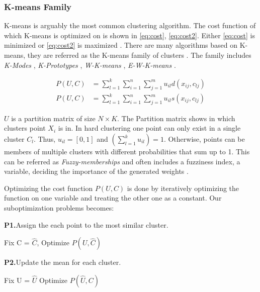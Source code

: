 \documentclass[../report.tex]{subfiles}
\begin{document}
\subsubsection{K-means Family}
K-means is arguably the most common clustering algorithm. The cost function of which K-means is optimized on is shown in \ref{eq:cost}, \ref{eq:cost2}. Either \ref{eq:cost} is minimized or \ref{eq:cost2} is maximized \cite{huang2005automated}.
There are many algorithms based on K-means, they are referred as the K-means family of clusters \cite{Huang1998}. The family includes \textit{K-Modes} \cite{Ng1999}, \textit{K-Prototypes} \cite{Huang97clusteringlarge}, \textit{W-K-means} \cite{huang2005automated}, \textit{E-W-K-means} \cite{Jing2007}.

\begin{align}
  \label{eq:cost}
  P(U,C) &= \sum^k_{l=1} \sum^n_{i=1} \sum^m_{j=1} u_{il} d(x_{ij},c_{lj}) \\
  \label{eq:cost2}
  P(U,C) &= \sum^k_{l=1} \sum^n_{i=1} \sum^m_{j=1} u_{il} s(x_{ij},c_{lj})
\end{align}

$U$ is a partition matrix of size $N \times K$. The Partition matrix shows in which clusters point $X_i$ is in.  In hard clustering one point can only exist in a single cluster $C_l$. Thus, $u_{il} = [0,1]$ and $(\sum_{ l=1 }^{ k } u_{il}) = 1$. Otherwise, points can be members of multiple clusters with different probabilities that sum up to 1. This can be referred as \textit{Fuzzy-memberships} and often includes a fuzziness index, a variable, deciding the importance of the generated weights \cite{Gan2006}.

Optimizing the cost function $P(U,C)$ is done by iteratively optimizing the function on one variable and treating the other one as a constant. Our suboptimization problems becomes:

\begin{description}
  \item \textbf{P1.}\quad Assign the each point to the most similar cluster. 
    \begin{description}
    	\item Fix C = $\hat{C}$, Optimize $P(U, \hat{ C })$
    \end{description}

  \item \textbf{P2.}\quad Update the mean for each cluster.
    \begin{description}
		\item Fix U = $\hat{U}$ Optimize $P(\hat{ U },C)$
    \end{description}
\end{description}
\end{document}
